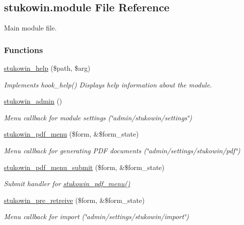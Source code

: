 \hypertarget{stukowin_8module}{\subsection{stukowin.\+module File Reference}
\label{stukowin_8module}
}


Main module file.  


\subsubsection*{Functions}
\begin{DoxyCompactItemize}
\item 
\hyperlink{stukowin_8module_a46a55e87f2112648570edbf437a083ef}{stukowin\+\_\+help} (\$path, \$arg)
\begin{DoxyCompactList}\small\item\em Implements hook\+\_\+help() Displays help information about the module. \end{DoxyCompactList}\item 
\hyperlink{group___stukowin___module_ga55d453d5b6f8ae4e643308d8814e67a5}{stukowin\+\_\+admin} ()
\begin{DoxyCompactList}\small\item\em Menu callback for module settings (\char`\"{}admin/stukowin/settings\char`\"{}) \end{DoxyCompactList}\item 
\hyperlink{group___drupal2_p_d_f_ga3649714a54a489d8c0096116fd9cb367}{stukowin\+\_\+pdf\+\_\+menu} (\$form, \&\$form\+\_\+state)
\begin{DoxyCompactList}\small\item\em Menu callback for generating P\+D\+F documents (\char`\"{}admin/settings/stukowin/pdf\char`\"{}) \end{DoxyCompactList}\item 
\hyperlink{group___drupal2_p_d_f_ga7fd34094c899b5a82949f401e30139a1}{stukowin\+\_\+pdf\+\_\+menu\+\_\+submit} (\$form, \&\$form\+\_\+state)
\begin{DoxyCompactList}\small\item\em Submit handler for \hyperlink{group___drupal2_p_d_f_ga3649714a54a489d8c0096116fd9cb367}{stukowin\+\_\+pdf\+\_\+menu()} \end{DoxyCompactList}\item 
\hyperlink{group___c_e_u_s2_drupal_ga481789ce9904fc10aefb8eaf7534133b}{stukowin\+\_\+pre\+\_\+retreive} (\$form, \&\$form\+\_\+state)
\begin{DoxyCompactList}\small\item\em Menu callback for import (\char`\"{}admin/settings/stukowin/import\char`\"{}) \end{DoxyCompactList}\item 

\end{DoxyCompactItemize}
